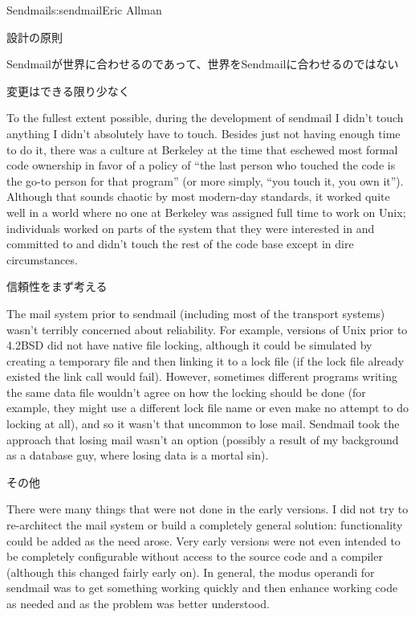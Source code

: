 \begin{aosachapter}{Sendmail}{s:sendmail}{Eric Allman}
\begin{aosasect1}{設計の原則}
\begin{aosasect2}{Sendmailが世界に合わせるのであって、世界をSendmailに合わせるのではない}
\end{aosasect2}

\begin{aosasect2}{変更はできる限り少なく}

To the fullest extent possible, during the development of sendmail I
didn't touch anything I didn't absolutely have to touch. Besides just
not having enough time to do it, there was a culture at Berkeley at
the time that eschewed most formal code ownership in favor of a policy
of ``the last person who touched the code is the go-to person for that
program'' (or more simply, ``you touch it, you own it''). Although
that sounds chaotic by most modern-day standards, it worked quite well
in a world where no one at Berkeley was assigned full time to work on
Unix; individuals worked on parts of the system that they were
interested in and committed to and didn't touch the rest of the code
base except in dire circumstances.

\end{aosasect2}

\begin{aosasect2}{信頼性をまず考える}

The mail system prior to sendmail (including most of the transport
systems) wasn't terribly concerned about reliability. For example,
versions of Unix prior to 4.2BSD did not have native file locking,
although it could be simulated by creating a temporary file and then
linking it to a lock file (if the lock file already existed the link
call would fail). However, sometimes different programs writing the
same data file wouldn't agree on how the locking should be done (for
example, they might use a different lock file name or even make no attempt
to do locking at all), and so it wasn't
that uncommon to lose mail.  Sendmail took the approach that losing
mail wasn't an option (possibly a result of my background as a
database guy, where losing data is a mortal sin).

\end{aosasect2}

\begin{aosasect2}{その他}

There were many things that were not done in the early versions.
I did not try to re-architect the mail system
or build a completely general solution:
functionality could be added as the need arose.
Very early versions were not even intended to be completely configurable
without access to the source code and a compiler
(although this changed fairly early on).
In general, the modus operandi for sendmail
was to get something working quickly
and then enhance working code as needed
and as the problem was better understood.


\end{aosasect2}
\end{aosasect1}
\end{aosachapter}
